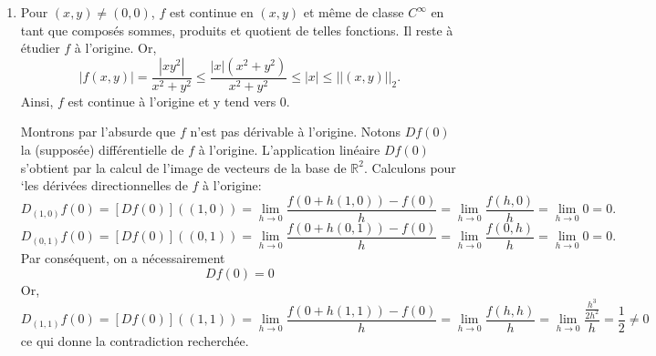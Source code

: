 {{\begin{enumerate}
\item Pour $(x,y) \neq (0,0)$, $f$ est continue en $(x,y)$ et même
de classe $C^\infty$ en tant que compos\'es sommes, produits et
quotient de telles fonctions. Il reste \`a \'etudier $f$ \`a
l'origine. Or, $$|f(x,y)|=\frac{|xy^2|}{x^2+y^2}\leq
\frac{|x|(x^2+y^2)}{x^2+y^2} \leq |x| \leq ||(x,y)||_2.$$ Ainsi,
$f$ est continue \`a l'origine et y tend vers $0$.

Montrons par l'absurde que $f$ n'est pas d\'erivable \`a
l'origine. Notons $Df(0)$ la (suppos\'ee) diff\'erentielle de $f$
\`a l'origine. L'application lin\'eaire $Df(0)$ s'obtient par la
calcul de l'image de vecteurs de la base de $\mathbb{R}^2$.
Calculons pour `les d\'eriv\'ees directionnelles de $f$ \`a
l'origine: $$D_{(1,0)}f(0)=[Df(0)]((1,0))= \lim_{h \rightarrow 0}
\frac{f(0+h(1,0))-f(0)}{h}=\lim_{h \rightarrow 0}
\frac{f(h,0)}{h}=\lim_{h \rightarrow 0} 0=0.$$
$$D_{(0,1)}f(0)=[Df(0)]((0,1))= \lim_{h \rightarrow 0}
\frac{f(0+h(0,1))-f(0)}{h}=\lim_{h \rightarrow 0}
\frac{f(0,h)}{h}=\lim_{h \rightarrow 0} 0=0.$$ Par cons\'equent,
on a n\'ecessairement $$Df(0)=0$$
Or,$$D_{(1,1)}f(0)=[Df(0)]((1,1))= \lim_{h \rightarrow 0}
\frac{f(0+h(1,1))-f(0)}{h}=\lim_{h \rightarrow 0}
\frac{f(h,h)}{h}=\lim_{h \rightarrow 0}
\frac{\frac{h^3}{2h^2}}{h}=\frac{1}{2} \neq 0$$ ce qui donne la
contradiction recherch\'ee.
\end{enumerate}}
}